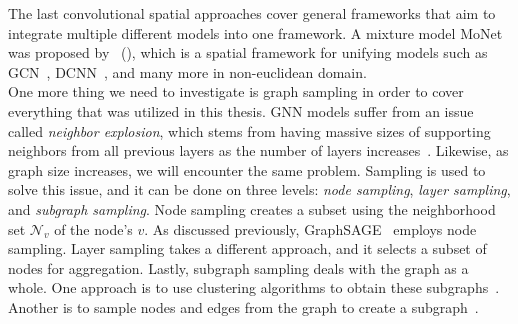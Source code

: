 The last convolutional spatial approaches cover general frameworks that aim to integrate multiple different models into one framework. A mixture model MoNet was proposed by~\citeauthor{GeometricDeepLearningOnGraphsAndManifolds_Monti} (\citeyear{GeometricDeepLearningOnGraphsAndManifolds_Monti}), which is a spatial framework for unifying models such as GCN~\parencite{GCN_Kipf}, DCNN~\parencite{DCNN_Atwood}, and many more in non-euclidean domain.\\
One more thing we need to investigate is graph sampling in order to cover everything that was utilized in this thesis. GNN models suffer from an issue called \emph{neighbor explosion}, which stems from having massive sizes of supporting neighbors from all previous layers as the number of layers increases~\parencite{GNNsAReview_Zhou}. Likewise, as graph size increases, we will encounter the same problem. Sampling is used to solve this issue, and it can be done on three levels: \emph{node sampling}, \emph{layer sampling}, and \emph{subgraph sampling}. Node sampling creates a subset using the neighborhood set $\mathcal{N}_v$ of the node's $v$. As discussed previously, GraphSAGE~\parencite{GraphSAGE_Hamilton} employs node sampling. Layer sampling takes a different approach, and it selects a subset of nodes for aggregation. Lastly, subgraph sampling deals with the graph as a whole. One approach is to use clustering algorithms to obtain these subgraphs~\parencite{ClusterGCN_Chiang}. Another is to sample nodes and edges from the graph to create a subgraph~\parencite{GraphSAINT_Zeng}.\\

